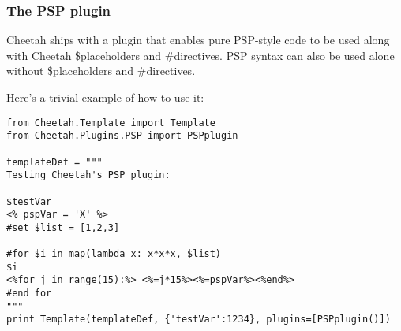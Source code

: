 \subsubsection{The PSP plugin}
Cheetah ships with a plugin that enables pure PSP-style code to be used along
with Cheetah \$placeholders and \#directives.  PSP syntax can also be used
alone without \$placeholders and \#directives.

Here's a trivial example of how to use it:
\begin{verbatim}
from Cheetah.Template import Template
from Cheetah.Plugins.PSP import PSPplugin

templateDef = """
Testing Cheetah's PSP plugin:
 
$testVar
<% pspVar = 'X' %>
#set $list = [1,2,3]
 
#for $i in map(lambda x: x*x*x, $list)
$i
<%for j in range(15):%> <%=j*15%><%=pspVar%><%end%>
#end for
"""
print Template(templateDef, {'testVar':1234}, plugins=[PSPplugin()])

\end{verbatim}

